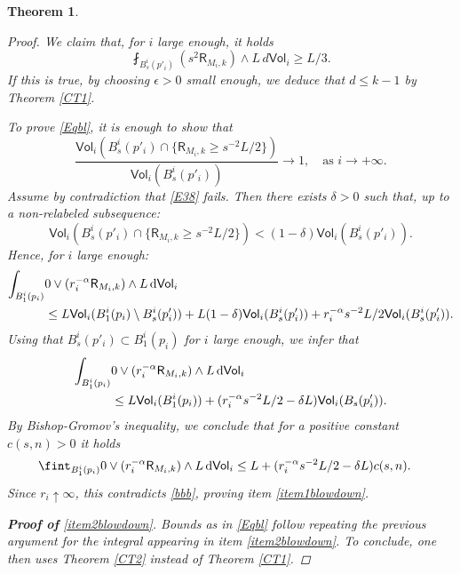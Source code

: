 \documentclass[10pt]{article}
\newtheorem{thm}{Theorem}[section]
\theoremstyle{definition}
\newcommand{\ssf}[1]{\mathsf{#1}}
\newcommand{\R}{\mathsf{R}}
\newcommand{\de}{{\rm d}}
\begin{document}
\begin{thm}
\begin{proof}
        We claim that, for $i$ large enough, it holds
        \begin{equation} \label{Eqbl}
        \fint_{B^i_{s}(p'_i)}(s^2 \R_{M_i,k}) \wedge L \,d \ssf{Vol}_i \geq L/3.
        \end{equation}
        If this is true, by choosing $\epsilon>0$ small enough, we deduce that $d \leq k-1$ by Theorem \ref{CT1}.

        To prove \eqref{Eqbl}, it is enough to show that
            \begin{equation} \label{E38}
            \frac{\ssf{Vol}_i(B^i_s(p'_i) \cap \{\R_{M_i,k} \geq s^{-2}L/2\})}{\ssf{Vol}_i(B^i_s(p'_i))} \rightarrow 1, \quad \text{as }i \to + \infty.
            \end{equation}
            Assume by contradiction that \eqref{E38} fails. Then there exists $\delta>0$ such that, up to a non-relabeled subsequence: 
            \[
            \ssf{Vol}_i(B^i_s(p'_i) \cap \{\R_{M_i,k} \geq s^{-2}L/2\}) < (1-\delta)\ssf{Vol}_i(B^i_s(p'_i)).
            \]
            Hence, for $i$ large enough:
            \begin{align*}
            \int_{B^i_1(p_i)}  &0 \vee (r_i^{-\alpha}\R_{M_i,k}) \wedge L \, \de\ssf{Vol}_i \\
            & \leq L \ssf{Vol}_i(B^i_1(p_i) \setminus B^i_s(p'_i))+L(1-\delta)\ssf{Vol}_i(B^i_s(p'_i))+r_i^{-\alpha}s^{-2}L/2\ssf{Vol}_i(B^i_s(p'_i)).
            \end{align*}
            Using that $B^i_s(p'_i) \subset B^i_1(p_i)$ for $i$ large enough, we infer that
            \begin{align*}
            \int_{B^i_1(p_i)}  & 0 \vee (r_i^{-\alpha}\R_{M_i,k}) \wedge L \, \de\ssf{Vol}_i \\
            & \leq L \ssf{Vol}_i(B^i_1(p_i) )+(r_i^{-\alpha}s^{-2}L/2-\delta L)\ssf{Vol}_i(B_s(p'_i)).
            \end{align*}
            By Bishop-Gromov's inequality, we conclude that for a positive constant $c(s,n)>0$ it holds
            \begin{align*}
            \fint_{B^i_1(p_i)}  &0 \vee (r_i^{-\alpha}\R_{M_i,k}) \wedge L \, \de\ssf{Vol}_i \leq
            L+(r_i^{-\alpha}s^{-2}L/2-\delta L)c(s,n).
            \end{align*}
            Since $r_i \uparrow \infty$, this contradicts \eqref{bbb}, proving item \ref{item1blowdown}.

            \textbf{Proof of }\ref{item2blowdown}. Bounds as in \eqref{Eqbl} follow repeating the previous argument for the integral appearing in item \ref{item2blowdown}. To conclude, one then uses Theorem \ref{CT2} instead of Theorem \ref{CT1}. 
    \end{proof}
\end{thm}
\end{document}
